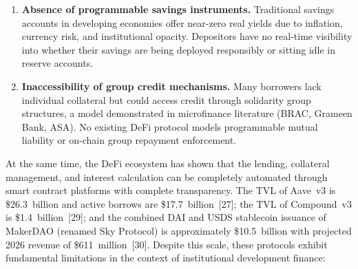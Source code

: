\documentclass[12pt,a4paper]{report}
\begin{document}
\begin{enumerate}[noitemsep]
\item \textbf{Absence of programmable savings instruments.} Traditional savings accounts in developing economies offer near-zero real yields due to inflation, currency risk, and institutional opacity. Depositors have no real-time visibility into whether their savings are being deployed responsibly or sitting idle in reserve accounts.

\item \textbf{Inaccessibility of group credit mechanisms.} Many borrowers lack individual collateral but could access credit through solidarity group structures, a model demonstrated in microfinance literature (BRAC, Grameen Bank, ASA). No existing DeFi protocol models programmable mutual liability or on-chain group repayment enforcement.
\end{enumerate}

At the same time, the DeFi ecosystem has shown that the lending, collateral management, and interest calculation can be completely automated through smart contract platforms with complete transparency. The TVL of Aave~v3 is \$26.3~billion and active borrows are \$17.7~billion~[27]; the TVL of Compound~v3 is \$1.4~billion~[29]; and the combined DAI and USDS stablecoin issuance of MakerDAO (renamed Sky Protocol) is approximately \$10.5~billion with projected 2026 revenue of \$611~million~[30]. Despite this scale, these protocols exhibit fundamental limitations in the context of institutional development finance:
\end{document}
